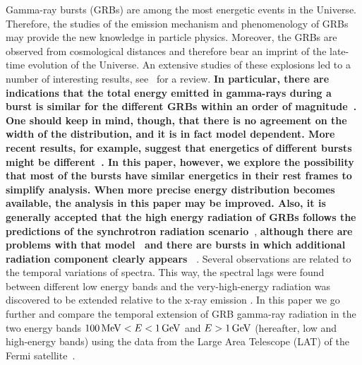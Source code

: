 \documentclass[manuscript]{aastex}
\begin{document}
Gamma-ray bursts (GRBs) are among the most energetic events in the
Universe. Therefore, the studies of the emission mechanism and
phenomenology of GRBs may provide the new knowledge in particle
physics. Moreover, the GRBs are observed from cosmological distances
and therefore bear an imprint of the late-time evolution of the
Universe. An extensive studies of these explosions led to a number of
interesting results, see~\citet{Vianello:2013ela,Gehrels:2013xd} for a
review. {\bf In particular, there are indications that the total energy emitted in gamma-rays during a
burst is similar for the different GRBs within an order
of magnitude~\citep{postnov1999grb,Bloom:2003wy,Goldstein:2015fib}.
One should keep in mind, though, that there is no agreement on the width of the distribution, and it is in fact model dependent. More recent results, for example, suggest that energetics of different bursts might be different~\citep{racusin2009jet, chandra2012radio}. In this paper, however, we explore the possibility that most of the
bursts have similar energetics in their rest frames to simplify analysis. When more precise energy distribution becomes available, the analysis in this paper may be improved. {\bf Also, it is generally accepted that} the
high energy radiation of GRBs follow{\bf s} the predictions of
the synchrotron radiation scenario~\citep{Wang:2013ptaw}}, {\bf although there are problems with that model~\citep{Daigne:2010fb} and there are bursts in which additional radiation component clearly appears~\citep{Abdo:2009pg} }. Several
observations are related to the temporal variations of spectra. This
way, the spectral lags were found between different low energy bands {\bf \citep{cheng1995time,Wu:1999ms} }and the very-high-energy radiation was discovered to
be extended relative to the x-ray emission
\citep{Castignani:2014gaa,Lange:2013uh,Vianello:2013ela}. In this paper
we go further and compare the temporal extension of GRB gamma-ray
radiation in the two energy bands $\unit[100]{MeV} < E <
\unit[1]{GeV}$ and $E > \unit[1]{GeV}$ (hereafter, low and high-energy
bands) using the data from the Large Area Telescope (LAT) of the Fermi
satellite~\citep{2009ApJ...697.1071A,Ackermann:2012kna}. 
\end{document}
